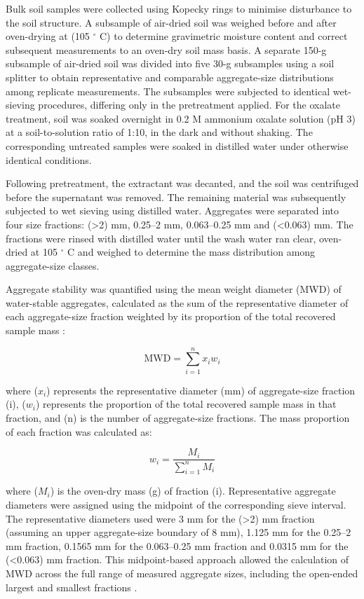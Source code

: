 \documentclass[preprint,12pt]{elsarticle}
\begin{document}
Bulk soil samples were collected using Kopecky rings to minimise disturbance to the soil structure. A subsample of air-dried soil was weighed before and after oven-drying at (105 $^\circ$ C) to determine gravimetric moisture content and correct subsequent measurements to an oven-dry soil mass basis. A separate 150-g subsample of air-dried soil was divided into five 30-g subsamples using a soil splitter to obtain representative and comparable aggregate-size distributions among replicate measurements. The subsamples were subjected to identical wet-sieving procedures, differing only in the pretreatment applied. For the oxalate treatment, soil was soaked overnight in 0.2 M ammonium oxalate solution (pH 3) at a soil-to-solution ratio of 1:10, in the dark and without shaking. The corresponding untreated samples were soaked in distilled water under otherwise identical conditions.

Following pretreatment, the extractant was decanted, and the soil was centrifuged before the supernatant was removed. The remaining material was subsequently subjected to wet sieving using distilled water. Aggregates were separated into four size fractions: (>2) mm, 0.25--2 mm, 0.063--0.25 mm and (<0.063) mm. The fractions were rinsed with distilled water until the wash water ran clear, oven-dried at 105 $^\circ$ C and weighed to determine the mass distribution among aggregate-size classes.

Aggregate stability was quantified using the mean weight diameter (MWD) of water-stable aggregates, calculated as the sum of the representative diameter of each aggregate-size fraction weighted by its proportion of the total recovered sample mass \citep{Abiven2009,KemperRosenau2018,Franzluebbers2022,Jimenez2025}:

\begin{equation}
    \mathrm{MWD} =
    \sum_{i=1}^{n} x_i w_i
    \label{eq:mwd}
\end{equation}
  
where ($x_i$) represents the representative diameter (mm) of aggregate-size fraction (i), ($w_i$) represents the proportion of the total recovered sample mass in that fraction, and (n) is the number of aggregate-size fractions. The mass proportion of each fraction was calculated as:
  
\begin{equation}
    w_i =
    \frac{M_i}{\sum_{i=1}^{n} M_i}
    \label{eq:mass_proportion}
\end{equation}

where ($M_i$) is the oven-dry mass (g) of fraction (i). Representative aggregate diameters were assigned using the midpoint of the corresponding sieve interval. The representative diameters used were 3 mm for the (>2) mm fraction (assuming an upper aggregate-size boundary of 8 mm), 1.125 mm for the 0.25--2 mm fraction, 0.1565 mm for the 0.063--0.25 mm fraction and 0.0315 mm for the (<0.063) mm fraction. This midpoint-based approach allowed the calculation of MWD across the full range of measured aggregate sizes, including the open-ended largest and smallest fractions \citep{Franzluebbers2022,Jimenez2025}.
\end{document}
